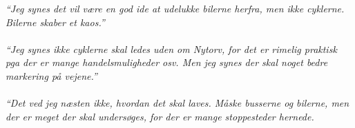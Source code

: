  \emph{“Jeg synes det vil være en god ide at udelukke bilerne herfra, men ikke cyklerne. Bilerne skaber et kaos.”}
~\\\\
\emph{“Jeg synes ikke cyklerne skal ledes uden om Nytorv, for det er rimelig praktisk pga der er mange handelsmuligheder osv. Men jeg synes der skal noget bedre markering på vejene.”}
~\\\\
\emph{“Det ved jeg næsten ikke, hvordan det skal laves. Måske busserne og bilerne, men der er meget der skal undersøges, for der er mange stoppesteder hernede.}
